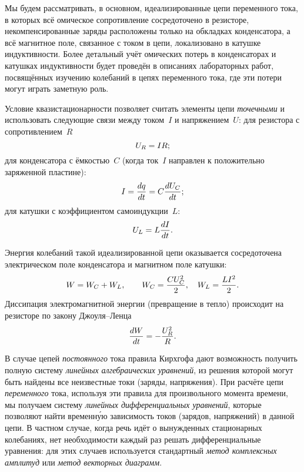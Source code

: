 Мы будем рассматривать, в основном, идеализированные цепи переменного тока,
в которых всё омическое сопротивление сосредоточено в резисторе,
некомпенсированные заряды расположены только на обкладках конденсатора, а всё
магнитное поле, связанное с током в цепи, локализовано в катушке индуктивности.
Более детальный учёт омических потерь в конденсаторах и катушках индуктивности
будет проведён в описаниях лабораторных работ, посвящённых изучению колебаний в
цепях переменного тока, где эти потери могут играть заметную роль.

Условие квазистационарности позволяет считать элементы цепи
\emph{точечными} и использовать следующие связи между током~$I$ и
напряжением~$U$:
для резистора с сопротивлением~$R$
\begin{equation}
	\eqmark{2.1}
	U_R=IR;
\end{equation}
для конденсатора с ёмкостью~$C$ (когда ток~$I$ направлен к положительно
заряженной пластине):
\begin{equation}
	\eqmark{2.2}
	I=\dfrac{dq}{dt}=C\dfrac{dU_C}{dt};
\end{equation}
для катушки с коэффициентом самоиндукции~$L$:
\begin{equation}
	\eqmark{2.3}
	U_L=L\dfrac{dI}{dt}.
\end{equation}

Энергия колебаний такой идеализированной цепи оказывается сосредоточена 
электрическом поле конденсатора и магнитном поле катушки:
\begin{equation}
\eqmark{W}
W = W_C + W_L,\qquad W_C = \frac{CU_C^2}{2},\quad W_L=\frac{LI^2}{2}.
\end{equation}
Диссипация электромагнитной энергии (превращение в тепло) происходит 
на резисторе по закону Джоуля--Ленца 
\begin{equation}
\eqmark{JL}
    \frac{dW}{dt} = -\frac{U_R^2}{R}.
\end{equation}

В случае цепей \emph{постоянного} тока правила Кирхгофа дают возможность получить
полную систему \emph{линейных алгебраических уравнений}, из решения которой могут быть
найдены все неизвестные токи (заряды, напряжения). При расчёте цепи 
\emph{переменного}
тока, используя эти правила для произвольного момента времени, мы получаем
систему \emph{линейных дифференциальных уравнений}, которые позволяют найти 
временн\'{у}ю
зависимость токов (зарядов, напряжений) в данной цепи. В частном случае, когда
речь идёт о вынужденных стационарных колебаниях, нет необходимости каждый раз
решать дифференциальные уравнения: для этих случаев используется стандартный
\emph{метод комплексных амплитуд} или \emph{метод векторных диаграмм}.

